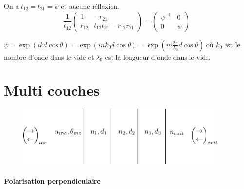 \documentclass[a4paper,english]{article}
\begin{document}
On a $t_{12} = t_{21} = \psi$ et aucune réflexion.
\begin{equation}\label{mfresp}
\frac{1}{t_{12}}\begin{pmatrix} 1 & -r_{21} \\ r_{12} & t_{12}t_{21} - r_{12}r_{21} \end{pmatrix} = \begin{pmatrix} \psi^{-1} & 0 \\ 0 & \psi \end{pmatrix}
\end{equation}

$\psi = \exp(i k d \cos \theta) = \exp(i n k_0 d \cos \theta) = \exp(i n \frac{2\pi}{\lambda_0} d \cos \theta)$ où $k_0$ est le nombre d'onde dans le vide et $\lambda_0$ est la longueur d'onde dans le vide.
















\section{Multi couches}

\begin{figure}[H]
	\centering
	\includegraphics[height=3cm]{film.pdf}
\end{figure}
\paragraph{Polarisation perpendiculaire}
\end{document}
